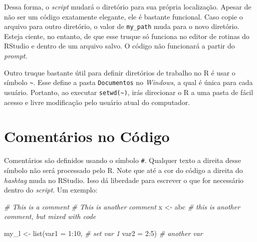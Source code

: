 \documentclass[
  11pt,
]{book}
\newenvironment{Shaded}{\begin{snugshade}}{\end{snugshade}}
\newcommand{\AttributeTok}[1]{\textcolor[rgb]{0.61,0.61,0.61}{#1}}
\newcommand{\CommentTok}[1]{\textcolor[rgb]{0.37,0.37,0.37}{\textit{#1}}}
\newcommand{\DecValTok}[1]{\textcolor[rgb]{0.06,0.06,0.06}{#1}}
\newcommand{\FunctionTok}[1]{\textcolor[rgb]{0,0,0}{#1}}
\newcommand{\NormalTok}[1]{#1}
\newcommand{\OtherTok}[1]{\textcolor[rgb]{0.37,0.37,0.37}{#1}}
\newcommand{\SpecialCharTok}[1]{\textcolor[rgb]{0,0,0}{#1}}
\newcommand{\StringTok}[1]{\textcolor[rgb]{0.5,0.5,0.5}{#1}}
\newenvironment{rmdimportant}
{\begin{importantblock}

	} {\end{importantblock}}
\begin{document}
\begin{Shaded}
\end{Shaded}

Dessa forma, o \emph{script} mudará o diretório para sua própria localização. Apesar de não ser um código exatamente elegante, ele é bastante funcional. Caso copie o arquivo para outro diretório, o valor de \texttt{my\_path} muda para o novo diretório. Esteja ciente, no entanto, de que esse truque só funciona no editor de rotinas do RStudio e dentro de um arquivo salvo. O código não funcionará a partir do \emph{prompt}.  

\begin{rmdimportant}
Outro truque bastante útil para definir diretórios de trabalho no R é
usar o símbolo \texttt{\textasciitilde{}}. Esse define a pasta
\texttt{\textquotesingle{}Documentos\textquotesingle{}} no
\emph{Windows}, a qual é única para cada usuário. Portanto, ao executar
\texttt{setwd(\textquotesingle{}\textasciitilde{}\textquotesingle{})},
irás direcionar o R a uma pasta de fácil acesso e livre modificação pelo
usuário atual do computador.
\end{rmdimportant}

\hypertarget{comentuxe1rios-no-cuxf3digo}{%
\section{Comentários no Código}\label{comentuxe1rios-no-cuxf3digo}}

Comentários são definidos usando o símbolo \texttt{\#}. Qualquer texto a direita desse símbolo não será processado pelo R. Note que até a cor do código a direita do \emph{hashtag} muda no RStudio. Isso dá liberdade para escrever o que for necessário dentro do \emph{script}. Um exemplo:

\begin{Shaded}
\begin{Highlighting}[]
\CommentTok{\# This is a comment}
\CommentTok{\# This is another comment}
\NormalTok{x }\OtherTok{\textless{}{-}} \StringTok{\textquotesingle{}abc\textquotesingle{}} \CommentTok{\# this is another comment, but mixed with code}

\NormalTok{my\_l }\OtherTok{\textless{}{-}} \FunctionTok{list}\NormalTok{(}\AttributeTok{var1 =} \DecValTok{1}\SpecialCharTok{:}\DecValTok{10}\NormalTok{,   }\CommentTok{\# set var 1}
             \AttributeTok{var2 =} \DecValTok{2}\SpecialCharTok{:}\DecValTok{5}\NormalTok{)    }\CommentTok{\# another var}
\end{Highlighting}
\end{Shaded}
\end{document}
